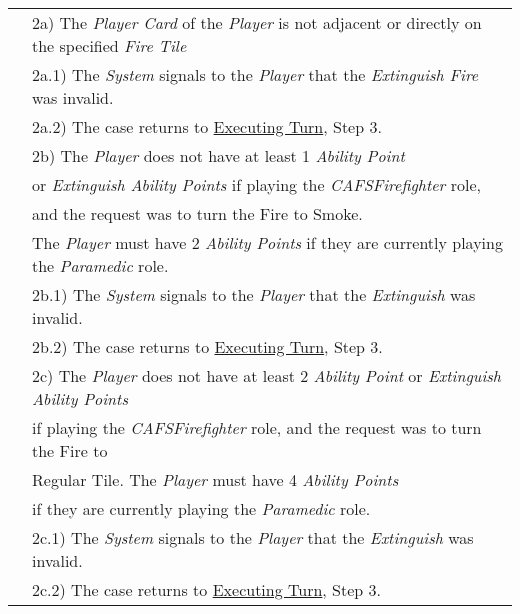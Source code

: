 \documentclass{article}
\begin{document}
	\begin{tabular}{l l}
		&2a) The \textit{Player Card} of the \textit{Player} is not adjacent or directly on the specified \textit{Fire Tile} \\
		&\qquad2a.1) The \textit{System} signals to the \textit{Player} that the \textit{Extinguish Fire} was invalid.\\ 
		&\qquad2a.2) The case returns to \underline{Executing Turn}, Step 3.\\
		&2b) The \textit{Player} does not have at least 1 \textit{Ability Point}\\
		&\qquad or \textit{Extinguish Ability Points} if playing the \textit{CAFSFirefighter} role,\\
		&\qquad and the request was to turn the Fire to Smoke.\\
		&\qquad The \textit{Player} must have 2 \textit{Ability Points} if they are currently playing the \textit{Paramedic} role. \\
		&\qquad2b.1) The \textit{System} signals to the \textit{Player} that the \textit{Extinguish} was invalid.\\ 
		&\qquad2b.2) The case returns to \underline{Executing Turn}, Step 3.\\
		&2c) The \textit{Player} does not have at least 2 \textit{Ability Point} or \textit{Extinguish Ability Points}\\
		&\qquad if playing the \textit{CAFSFirefighter} role, and the request was to turn the Fire to\\
		&\qquad Regular Tile. The \textit{Player} must have 4 \textit{Ability Points}\\
		&\qquad if they are currently playing the \textit{Paramedic} role.\\
		&\qquad2c.1) The \textit{System} signals to the \textit{Player} that the \textit{Extinguish} was invalid.\\ 
		&\qquad2c.2) The case returns to \underline{Executing Turn}, Step 3.\\
	\end{tabular}
	
\end{document}
